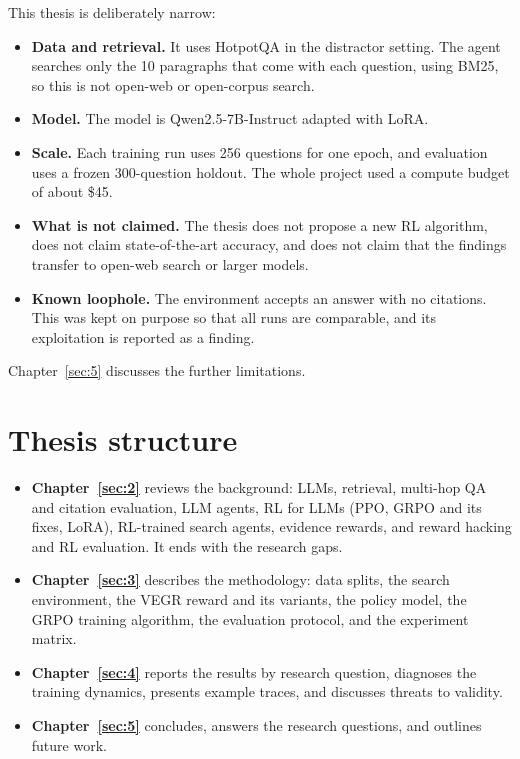 This thesis is deliberately narrow:

\begin{itemize}
\tightlist
\item
  \textbf{Data and retrieval.} It uses HotpotQA in the distractor
  setting. The agent searches only the 10 paragraphs that come with each
  question, using BM25, so this is not open-web or open-corpus search.
\item
  \textbf{Model.} The model is Qwen2.5-7B-Instruct adapted with LoRA.
\item
  \textbf{Scale.} Each training run uses 256 questions for one epoch,
  and evaluation uses a frozen 300-question holdout. The whole project
  used a compute budget of about \$45.
\item
  \textbf{What is not claimed.} The thesis does not propose a new RL
  algorithm, does not claim state-of-the-art accuracy, and does not
  claim that the findings transfer to open-web search or larger models.
\item
  \textbf{Known loophole.} The environment accepts an answer with no
  citations. This was kept on purpose so that all runs are comparable,
  and its exploitation is reported as a finding.
\end{itemize}

Chapter~\ref{sec:5} discusses the further limitations.

\section{Thesis structure}\label{sec:1.7}

\begin{itemize}
\tightlist
\item
  \textbf{Chapter~\ref{sec:2}} reviews the background: LLMs, retrieval,
  multi-hop QA and citation evaluation, LLM agents, RL for LLMs (PPO,
  GRPO and its fixes, LoRA), RL-trained search agents, evidence rewards,
  and reward hacking and RL evaluation. It ends with the research gaps.
\item
  \textbf{Chapter~\ref{sec:3}} describes the methodology: data splits,
  the search environment, the VEGR reward and its variants, the policy
  model, the GRPO training algorithm, the evaluation protocol, and the
  experiment matrix.
\item
  \textbf{Chapter~\ref{sec:4}} reports the results by research question,
  diagnoses the training dynamics, presents example traces, and
  discusses threats to validity.
\item
  \textbf{Chapter~\ref{sec:5}} concludes, answers the research
  questions, and outlines future work.
\end{itemize}
